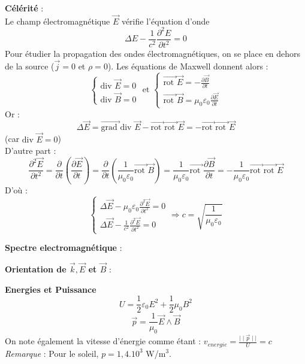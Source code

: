 \noindent\textbf{Célérité} : \\
Le champ électromagnétique $\vec{E}$ vérifie l'équation d'onde 
\[\Delta E-\frac{1}{c^2}\frac{\partial^2E}{\partial t^2}=0\]
Pour étudier la propagation des ondes électromagnétiques, on se place en dehors de la source ($\vec{j}=0$ et $\rho=0$). Les équations de Maxwell donnent alors :
\[
\left \{
  \begin{array}{l}
  \textrm{div }\vec{E}=0 \\
  \textrm{div }\vec{B}=0
  \end{array}
\right.
\textrm{ et }
\left \{
  \begin{array}{l}
  \vec{\textrm{rot }}\vec{E}=-\frac{\partial{\vec{B}}}{\partial t} \\
  \vec{\textrm{rot }}\vec{B}=\mu_0\varepsilon_0\frac{\partial\vec{E}}{\partial t}
  \end{array}
\right.
\]
Or : \[\Delta\vec{E}=\vec{\textrm{grad }}\textrm{div }\vec{E}-\vec{\textrm{rot }}\vec{\textrm{rot }}\vec{E}=-\vec{\textrm{rot }}\vec{\textrm{rot }}\vec{E}\] (car $\textrm{div }\vec{E} = 0$)\\
D'autre part : \[\frac{\partial^2\vec{E}}{\partial t^2}=\frac{\partial}{\partial t}(\frac{\partial\vec{E}}{\partial t})=\frac{\partial}{\partial t}(\frac{1}{\mu_0\varepsilon_0}\vec{\textrm{rot }}\vec{B})=\frac{1}{\mu_0\varepsilon_0}\vec{\textrm{rot }}\frac{\partial \vec{B}}{\partial t}=-\frac{1}{\mu_0\varepsilon_0}\vec{\textrm{rot }}\vec{\textrm{rot }}\vec{E}\]
D'où :
\[
\left \{
  \begin{array}{l}
  \Delta\vec E - \mu_0\varepsilon_0\frac{\partial^2\vec E}{\partial t^2}=0\\
  \Delta\vec E - \frac{1}{c^2}\frac{\partial^2\vec E}{\partial t^2}=0
  \end{array}
\right.
\Rightarrow c = \sqrt{\frac{1}{\mu_0\varepsilon_0}}
\]

\noindent\textbf{Spectre electromagnétique} : \\

\noindent\textbf{Orientation de $\vec k, \vec E$ et $\vec B$} : \\

\noindent\textbf{Energies et Puissance}
\[ U=\frac{1}{2}\varepsilon_0E^2+\frac{1}{2}\mu_0B^2 \]
\[ \vec p=\frac{1}{\mu_0}\vec E \wedge \vec B \]
On note également la vitesse d'énergie comme étant : $v_{energie}=\frac{\mid\mid\vec p\mid\mid}{U}=c$ \\
\emph{Remarque} : Pour le soleil, $p=1,4.10^3$ W/m$^3$.

